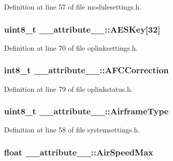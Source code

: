 \-Definition at line 57 of file modulesettings.\-h.

\hypertarget{struct____attribute_____a5ab8430b7b9de7ac3e630ccbce18e705}{
\subsubsection[{\-A\-E\-S\-Key}]{\setlength{\rightskip}{0pt plus 5cm}uint8\-\_\-t {\bf \-\_\-\-\_\-attribute\-\_\-\-\_\-\-::\-A\-E\-S\-Key}\mbox{[}32\mbox{]}}}\label{struct____attribute_____a5ab8430b7b9de7ac3e630ccbce18e705}


\-Definition at line 70 of file oplinksettings.\-h.

\hypertarget{struct____attribute_____a392499f88b4daed4de6c218532b857d9}{
\subsubsection[{\-A\-F\-C\-Correction}]{\setlength{\rightskip}{0pt plus 5cm}int8\-\_\-t {\bf \-\_\-\-\_\-attribute\-\_\-\-\_\-\-::\-A\-F\-C\-Correction}}}\label{struct____attribute_____a392499f88b4daed4de6c218532b857d9}


\-Definition at line 79 of file oplinkstatus.\-h.

\hypertarget{struct____attribute_____a91a58077ae949f4823b65b94999f3155}{
\subsubsection[{\-Airframe\-Type}]{\setlength{\rightskip}{0pt plus 5cm}uint8\-\_\-t {\bf \-\_\-\-\_\-attribute\-\_\-\-\_\-\-::\-Airframe\-Type}}}\label{struct____attribute_____a91a58077ae949f4823b65b94999f3155}


\-Definition at line 58 of file systemsettings.\-h.

\hypertarget{struct____attribute_____a271b5650008ba4868d5fd3d0e50b9190}{
\subsubsection[{\-Air\-Speed\-Max}]{\setlength{\rightskip}{0pt plus 5cm}float {\bf \-\_\-\-\_\-attribute\-\_\-\-\_\-\-::\-Air\-Speed\-Max}}}\label{struct____attribute_____a271b5650008ba4868d5fd3d0e50b9190}


